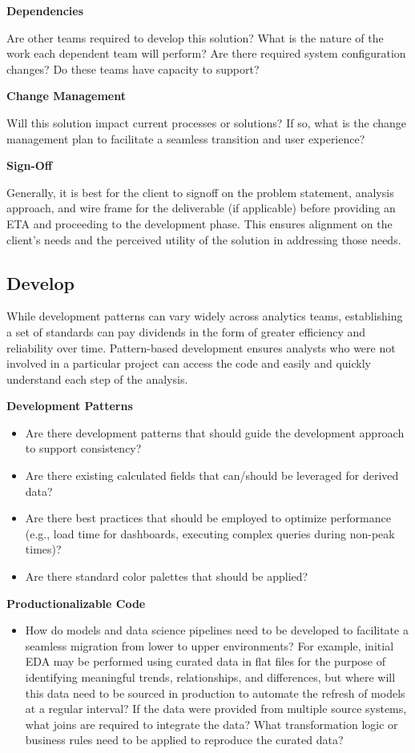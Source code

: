 \documentclass[
]{book}
\providecommand{\tightlist}{%
  \setlength{\itemsep}{0pt}\setlength{\parskip}{0pt}}
\begin{document}
\textbf{Dependencies}

Are other teams required to develop this solution? What is the nature of the work each dependent team will perform? Are there required system configuration changes? Do these teams have capacity to support?

\textbf{Change Management}

Will this solution impact current processes or solutions? If so, what is the change management plan to facilitate a seamless transition and user experience?

\textbf{Sign-Off}

Generally, it is best for the client to signoff on the problem statement, analysis approach, and wire frame for the deliverable (if applicable) before providing an ETA and proceeding to the development phase. This ensures alignment on the client's needs and the perceived utility of the solution in addressing those needs.

\hypertarget{develop}{%
\subsection{Develop}\label{develop}}

While development patterns can vary widely across analytics teams, establishing a set of standards can pay dividends in the form of greater efficiency and reliability over time. Pattern-based development ensures analysts who were not involved in a particular project can access the code and easily and quickly understand each step of the analysis.

\textbf{Development Patterns}

\begin{itemize}
\tightlist
\item
  Are there development patterns that should guide the development approach to support consistency?
\item
  Are there existing calculated fields that can/should be leveraged for derived data?
\item
  Are there best practices that should be employed to optimize performance (e.g., load time for dashboards, executing complex queries during non-peak times)?
\item
  Are there standard color palettes that should be applied?
\end{itemize}

\textbf{Productionalizable Code}

\begin{itemize}
\tightlist
\item
  How do models and data science pipelines need to be developed to facilitate a seamless migration from lower to upper environments? For example, initial EDA may be performed using curated data in flat files for the purpose of identifying meaningful trends, relationships, and differences, but where will this data need to be sourced in production to automate the refresh of models at a regular interval? If the data were provided from multiple source systems, what joins are required to integrate the data? What transformation logic or business rules need to be applied to reproduce the curated data?
\end{itemize}
\end{document}
